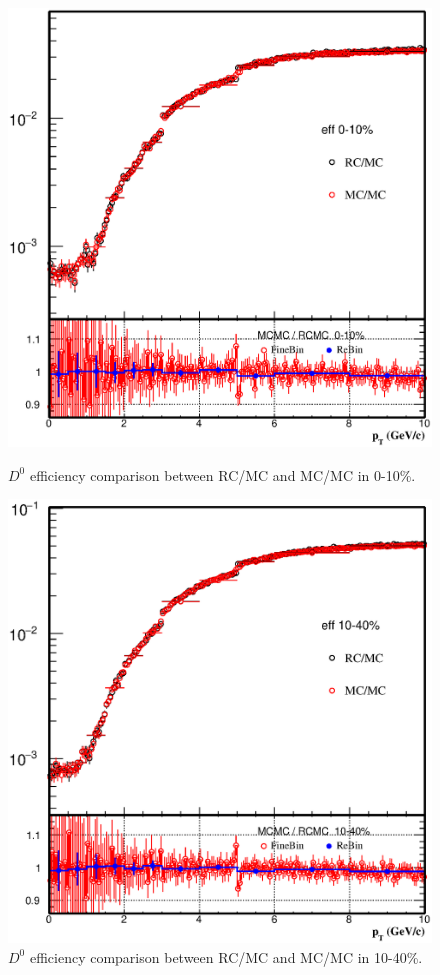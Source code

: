 \begin{figure}[htbp]
\begin{minipage}[htbp]{0.52\linewidth}
\centering
\includegraphics[width=1.0\textwidth]{figure/Run14_D0HFT/D0_eff_forMCRC_0_10.eps}
\caption{$D^{0}$ efficiency comparison between RC/MC and MC/MC in 0-10\%. \label{D0_eff_forMCRC_0_10}}
\end{minipage}
\hfill
\begin{minipage}[htbp]{0.52\linewidth}
\centering
\includegraphics[width=1.0\textwidth]{figure/Run14_D0HFT/D0_eff_forMCRC_10_40.eps} 
\caption{$D^{0}$ efficiency comparison between RC/MC and MC/MC in 10-40\%. \label{D0_eff_forMCRC_10_40}}
\end{minipage}
\end{figure}

